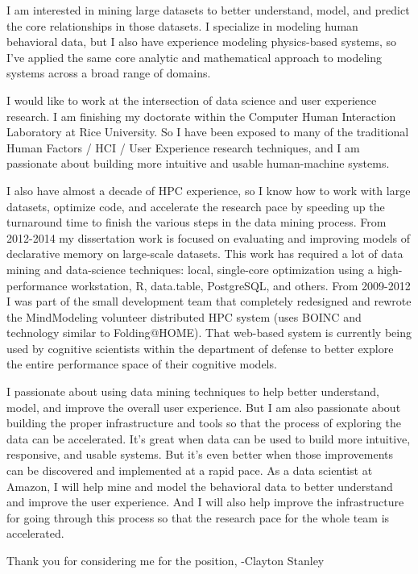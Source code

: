 \documentclass{article}
\begin{document}
I am interested in mining large datasets to better understand, model, and predict the core relationships in those datasets.
I specialize in modeling human behavioral data, but I also have experience modeling physics-based systems,
so I've applied the same core analytic and mathematical approach to modeling systems across a broad range of domains.

I would like to work at the intersection of data science and user experience research.
I am finishing my doctorate within the Computer Human Interaction Laboratory at Rice University.
So I have been exposed to many of the traditional Human Factors / HCI / User Experience research techniques, and I am passionate about building more intuitive and usable human-machine systems.

I also have almost a decade of HPC experience, so I know how to work with large datasets, optimize code,
and accelerate the research pace by speeding up the turnaround time to finish the various steps in the data mining process. 
From 2012-2014 my dissertation work is focused on evaluating and improving models of declarative memory on large-scale datasets.
This work has required a lot of data mining and data-science techniques: local, single-core optimization using a high-performance workstation, R, data.table, PostgreSQL, and others.
From 2009-2012 I was part of the small development team that completely redesigned and rewrote the MindModeling volunteer distributed HPC system (uses BOINC and technology similar to Folding@HOME).
That web-based system is currently being used by cognitive scientists within the department of defense to better explore the entire performance space of their cognitive models.

I passionate about using data mining techniques to help better understand, model, and improve the overall user experience. 
But I am also passionate about building the proper infrastructure and tools so that the process of exploring the data can be accelerated.
It's great when data can be used to build more intuitive, responsive, and usable systems.
But it's even better when those improvements can be discovered and implemented at a rapid pace.
As a data scientist at Amazon, I will help mine and model the behavioral data to better understand and improve the user experience.
And I will also help improve the infrastructure for going through this process so that the research pace for the whole team is accelerated.

Thank you for considering me for the position,
-Clayton Stanley
\end{document}

